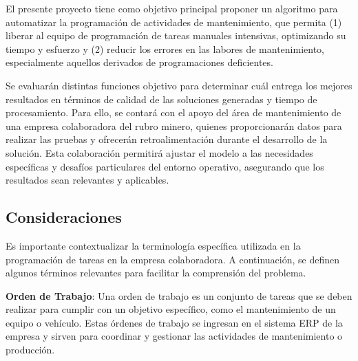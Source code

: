 \documentclass{article}
\begin{document}
El presente proyecto tiene como objetivo principal proponer un algoritmo para automatizar la programación de actividades de mantenimiento, que permita (1) liberar al equipo de programación de tareas manuales intensivas, optimizando su tiempo y esfuerzo y (2) reducir los errores en las labores de mantenimiento, especialmente aquellos derivados de programaciones deficientes. 

Se evaluarán distintas funciones objetivo para determinar cuál entrega los mejores resultados en términos de calidad de las soluciones generadas y tiempo de procesamiento. Para ello, se contará con el apoyo del área de mantenimiento de una empresa colaboradora del rubro minero, quienes proporcionarán datos para realizar las pruebas y ofrecerán retroalimentación durante el desarrollo de la solución. Esta colaboración permitirá ajustar el modelo a las necesidades específicas y desafíos particulares del entorno operativo, asegurando que los resultados sean relevantes y aplicables.


\subsection{Consideraciones}
Es importante contextualizar la terminología específica utilizada en la programación de tareas en la empresa colaboradora. A continuación, se definen algunos términos relevantes para facilitar la comprensión del problema.


\textbf{Orden de Trabajo}: Una orden de trabajo es un conjunto de tareas que se deben realizar para cumplir con un objetivo específico, como el mantenimiento de un equipo o vehículo. Estas órdenes de trabajo se ingresan en el sistema ERP de la empresa y sirven para coordinar y gestionar las actividades de mantenimiento o producción.

\end{document}
